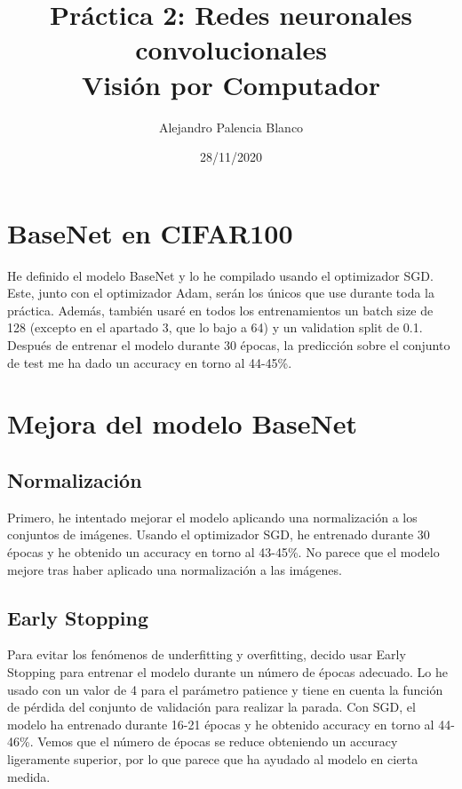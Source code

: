 \documentclass[10pt,a4paper]{article}
\title{
Práctica 2: Redes neuronales convolucionales\\
\large Visión por Computador \\
}
\author{
Alejandro Palencia Blanco\\
}
\date{28/11/2020}
\begin{document}
\maketitle


\section{BaseNet en CIFAR100}

He definido el modelo BaseNet y lo he compilado usando el optimizador SGD. Este, junto con el optimizador Adam, serán los únicos que use durante toda la práctica. Además, también usaré en todos los entrenamientos un batch size de 128 (excepto en el apartado 3, que lo bajo a 64) y un validation split de 0.1. Después de entrenar el modelo durante 30 épocas, la predicción sobre el conjunto de test me ha dado un accuracy en torno al 44-45\%.
\hfill \break




\section{Mejora del modelo BaseNet}

\subsection{Normalización}

Primero, he intentado mejorar el modelo aplicando una normalización a los conjuntos de imágenes. Usando el optimizador SGD, he entrenado durante 30 épocas y he obtenido un accuracy en torno al 43-45\%. No parece que el modelo mejore tras haber aplicado una normalización a las imágenes.



\subsection{Early Stopping}

Para evitar los fenómenos de underfitting y overfitting, decido usar Early Stopping para entrenar el modelo durante un número de épocas adecuado. Lo he usado con un valor de 4 para el parámetro patience y tiene en cuenta la función de pérdida del conjunto de validación para realizar la parada. Con SGD, el modelo ha entrenado durante 16-21 épocas y he obtenido accuracy en torno al 44-46\%. Vemos que el número de épocas se reduce obteniendo un accuracy ligeramente superior, por lo que parece que ha ayudado al modelo en cierta medida.
\end{document}
